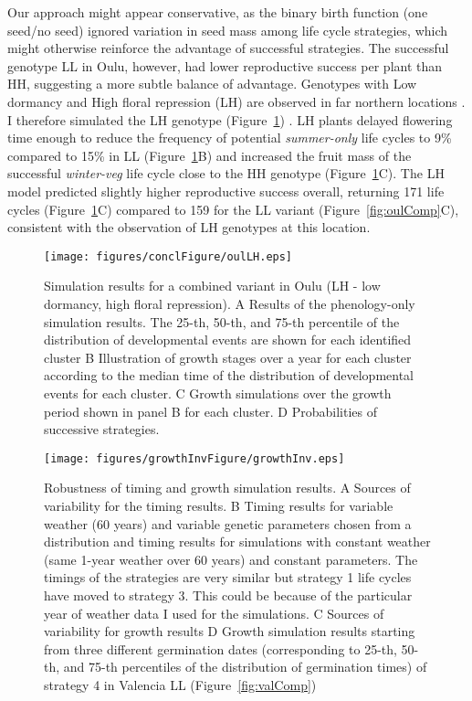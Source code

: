 Our approach might appear conservative, as the binary birth function (one
seed/no seed) ignored variation in seed mass among life cycle strategies, which
might otherwise reinforce the advantage of successful strategies. The successful
genotype LL in Oulu, however, had lower reproductive success per plant than HH,
suggesting a more subtle balance of advantage. Genotypes with Low dormancy and
High floral repression (LH) are observed in far northern locations
\citep{atwell_genome-wide_2010}. I therefore simulated the LH genotype
(Figure~\ref{fig:oulLH}) . LH plants delayed flowering time enough to reduce the
frequency of potential \emph{summer-only} life cycles to 9\% compared to 15\% in
LL (Figure~\ref{fig:oulLH}B) and increased the fruit mass of the successful
\emph{winter-veg} life cycle close to the HH genotype
(Figure~\ref{fig:oulLH}C). The LH model predicted slightly higher reproductive
success overall, returning 171 life cycles (Figure~\ref{fig:oulLH}C) compared to
159 for the LL variant (Figure~\ref{fig:oulComp}C), consistent with the
observation of LH genotypes at this location.

\begin{figure}[tb]
\centering
\texttt{[image: figures/conclFigure/oulLH.eps]}
\caption{Simulation results for a combined variant in Oulu (LH - low dormancy,
  high floral repression). A Results of the phenology-only simulation
  results. The 25-th, 50-th, and 75-th percentile of the distribution of
  developmental events are shown for each identified cluster B Illustration of
  growth stages over a year for each cluster according to the median time of the
  distribution of developmental events for each cluster. C Growth simulations
  over the growth period shown in panel B for each cluster.  D Probabilities of
  successive strategies.}
\label{fig:oulLH}
\end{figure}

\begin{figure}[tb]
\centering
\texttt{[image: figures/growthInvFigure/growthInv.eps]}
\caption{Robustness of timing and growth simulation results.  A Sources of
  variability for the timing results. B Timing results for variable weather (60
  years) and variable genetic parameters chosen from a distribution and timing
  results for simulations with constant weather (same 1-year weather over 60
  years) and constant parameters. The timings of the strategies are very similar
  but strategy 1 life cycles have moved to strategy 3. This could be because of
  the particular year of weather data I used for the simulations. C Sources of
  variability for growth results D Growth simulation results starting from three
  different germination dates (corresponding to 25-th, 50-th, and 75-th
  percentiles of the distribution of germination times) of strategy 4 in
  Valencia LL (Figure~\ref{fig:valComp})}
\label{fig:growthInv}
\end{figure}

